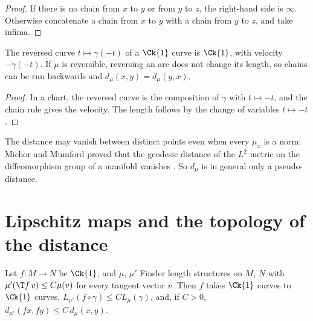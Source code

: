 \begin{proof}
  \leanok
  If there is no chain from $x$ to $y$ or from $y$ to $z$, the right-hand side is $\infty$.
  Otherwise concatenate a chain from $x$ to $y$ with a chain from $y$ to $z$, and take infima.
\end{proof}

\begin{proposition}
  \label{prop:mt-dist-comm}
  \leanok
  The reversed curve $t \mapsto \gamma(-t)$ of a $\Ck{1}$ curve is $\Ck{1}$, with velocity
  $-\dot\gamma(-t)$. If $\mu$ is reversible, reversing an arc does not change its length, so
  chains can be run backwards and $d_\mu(x, y) = d_\mu(y, x)$.
\end{proposition}

\begin{proof}
  \leanok
  In a chart, the reversed curve is the composition of $\gamma$ with $t \mapsto -t$, and the
  chain rule gives the velocity. The length follows by the change of variables $t \mapsto -t$.
\end{proof}

\begin{remark}
  The distance may vanish between distinct points even when every $\mu_x$ is a norm: Michor and
  Mumford proved that the geodesic distance of the $L^2$ metric on the diffeomorphism group of a
  manifold vanishes \cite[Thm.~5.2]{MM05}. So $d_\mu$ is in general only a pseudo-distance.
\end{remark}

\section{Lipschitz maps and the topology of the distance}
\label{sec:mt-lipschitz}

\begin{lemma}
  \label{lem:mt-lipschitz}
  \leanok
  Let $f\colon M \to N$ be $\Ck{1}$, and $\mu$, $\mu'$ Finsler length structures on $M$, $N$
  with $\mu'(\T f\, v) \leq C \mu(v)$ for every tangent vector $v$. Then $f$ takes $\Ck{1}$
  curves to $\Ck{1}$ curves, $L_{\mu'}(f \circ \gamma) \leq C L_\mu(\gamma)$, and, if $C > 0$,
  $d_{\mu'}(f x, f y) \leq C\, d_\mu(x, y)$.
\end{lemma}

